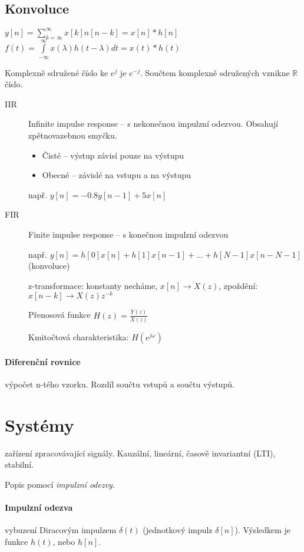 \documentclass[a4paper, 11pt]{report}
\begin{document}
\subsection{Konvoluce}
$y[n] = \sum\limits_{k = \infty}^\infty x[k] n[n-k] = x[n] * h[n]$\\
$f(t) = \int\limits_{-\infty}^\infty x(\lambda) h(t-\lambda)dt = x(t)*h(t)$

Komplexně sdružené číslo ke $e^j$ je $e^{-j}$. Součtem komplexně sdružených vznikne $\mathbb{R}$ číslo.

\begin{description}
	\item[IIR] Infinite impulse response -- s nekonečnou impulzní odezvou. Obsahují zpětnovazebnou smyčku.
	\begin{itemize}
		\item Čisté -- výstup závisí pouze na výstupu
		\item Obecné -- závislé na vstupu a na výstupu
	\end{itemize}
	
	např. $y[n] = -0.8 y[n-1] + 5 x[n]$
	
	\item[FIR] Finite impulse response -- s konečnou impulzní odezvou
	
	např. $y[n] = h[0] x[n] + h[1] x[n-1] + \dots + h[N-1] x[n - N - 1]$ (konvoluce)
	
	z-transformace: konstanty necháme, $x[n] \to X(z)$, zpoždění: $x[n-k] \to X(z)z^{-k}$
	
	Přenosová funkce $H(z) = \frac{Y(z)}{X(z)}$
	
	Kmitočtová charakteristika: $H(e^{j\omega})$
\end{description}

\paragraph{Diferenční rovnice} výpočet n-tého vzorku. Rozdíl  součtu vstupů a součtu výstupů.

\section{Systémy}

zařízení zpracovávající signály. Kauzální, lineární, časově invariantní (LTI), stabilní.

Popis pomocí \emph{impulzní odezvy}.

\paragraph{Impulzní odezva} vybuzení Diracovým impulzem $\delta(t)$ (jednotkový impulz $\delta[n]$). Výsledkem je funkce $h(t)$, nebo $h[n]$.
\end{document}
